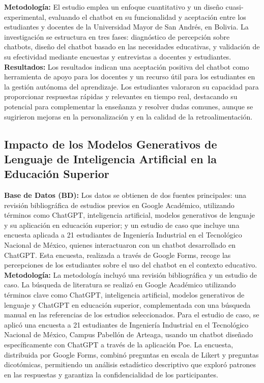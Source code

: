 \documentclass[10pt,a4paper]{article}
\begin{document}
\textbf{Metodología:} El estudio emplea un enfoque cuantitativo y un diseño cuasi-experimental, evaluando el chatbot en su funcionalidad y aceptación entre los estudiantes y docentes de la Universidad Mayor de San Andrés, en Bolivia. La investigación se estructura en tres fases: diagnóstico de percepción sobre chatbots, diseño del chatbot basado en las necesidades educativas, y validación de su efectividad mediante encuestas y entrevistas a docentes y estudiantes. \\

\textbf{Resultados:} Los resultados indican una aceptación positiva del chatbot como herramienta de apoyo para los docentes y un recurso útil para los estudiantes en la gestión autónoma del aprendizaje. Los estudiantes valoraron su capacidad para proporcionar respuestas rápidas y relevantes en tiempo real, destacando su potencial para complementar la enseñanza y resolver dudas comunes, aunque se sugirieron mejoras en la personalización y en la calidad de la retroalimentación. \\


\subsection{Impacto de los Modelos Generativos de Lenguaje de Inteligencia Artificial en la Educación Superior}

\textbf{Base de Datos (BD):} Los datos se obtienen de dos fuentes principales: una revisión bibliográfica de estudios previos en Google Académico, utilizando términos como ChatGPT, inteligencia artificial, modelos generativos de lenguaje y su aplicación en educación superior; y un estudio de caso que incluye una encuesta aplicada a 21 estudiantes de Ingeniería Industrial en el Tecnológico Nacional de México, quienes interactuaron con un chatbot desarrollado en ChatGPT. Esta encuesta, realizada a través de Google Forms, recoge las percepciones de los estudiantes sobre el uso del chatbot en el contexto educativo. \\

\textbf{Metodología:} La metodología incluyó una revisión bibliográfica y un estudio de caso. La búsqueda de literatura se realizó en Google Académico utilizando términos clave como ChatGPT, inteligencia artificial, modelos generativos de lenguaje y ChatGPT en educación superior, complementada con una búsqueda manual en las referencias de los estudios seleccionados. Para el estudio de caso, se aplicó una encuesta a 21 estudiantes de Ingeniería Industrial en el Tecnológico Nacional de México, Campus Pabellón de Arteaga, usando un chatbot diseñado específicamente con ChatGPT a través de la aplicación Poe. La encuesta, distribuida por Google Forms, combinó preguntas en escala de Likert y preguntas dicotómicas, permitiendo un análisis estadístico descriptivo que exploró patrones en las respuestas y garantiza la confidencialidad de los participantes. \\
\end{document}
